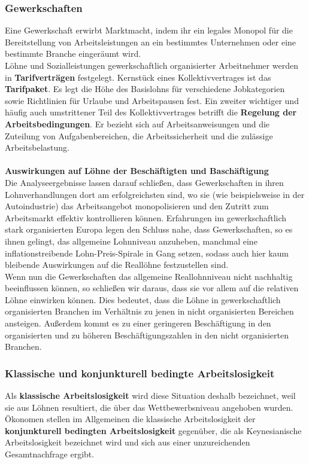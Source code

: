 \documentclass[10pt]{scrartcl}
\begin{document}
\subsubsection{Gewerkschaften}
Eine Gewerkschaft erwirbt Marktmacht, indem ihr ein legales Monopol für die Bereitstellung von Arbeitsleistungen an ein bestimmtes Unternehmen oder eine bestimmte Branche eingeräumt wird.\\
Löhne und Sozialleistungen gewerkschaftlich organisierter Arbeitnehmer werden in {\bf Tarifverträgen} festgelegt. Kernstück eines Kollektivvertrages ist das {\bf Tarifpaket}. Es legt die Höhe des Basislohns für verschiedene Jobkategorien sowie Richtlinien für Urlaube und Arbeitspausen fest. Ein zweiter wichtiger und häufig auch umstrittener Teil des Kollektivvertrages betrifft die {\bf Regelung der Arbeitsbedingungen}. Er bezieht sich auf Arbeitsanweisungen und die Zuteilung von Aufgabenbereichen, die Arbeitssicherheit und die zulässige Arbeitsbelastung. \\ \\
{\bf Auswirkungen auf Löhne der Beschäftigten und Baschäftigung}\\
Die Analyseergebnisse lassen darauf schließen, dass Gewerkschaften in ihren Lohnverhandlungen dort am erfolgreichsten sind, wo sie (wie beispielsweise in der Autoindustrie) das Arbeitsangebot monopolisieren und den Zutritt zum Arbeitsmarkt effektiv kontrollieren können. Erfahrungen im gewerkschaftlich stark organisierten Europa legen den Schluss nahe, dass Gewerkschaften, so es ihnen gelingt, das allgemeine Lohnniveau anzuheben, manchmal eine inflationstreibende Lohn-Preis-Spirale in Gang setzen, sodass auch hier kaum bleibende Auswirkungen auf die Reallöhne festzustellen sind.\\ Wenn nun die Gewerkschaften das allgemeine Reallohnniveau nicht nachhaltig beeinflussen können, so schließen wir daraus, dass sie vor allem auf die relativen Löhne einwirken können. Dies bedeutet, dass die Löhne in gewerkschaftlich organisierten Branchen im Verhältnis zu jenen in nicht organisierten Bereichen ansteigen. Außerdem kommt es zu einer geringeren Beschäftigung in den organisierten und zu höheren Beschäftigungszahlen in den nicht organisierten Branchen.

\subsubsection{Klassische und konjunkturell bedingte Arbeitslosigkeit}
Als {\bf klassische Arbeitslosigkeit } wird diese Situation deshalb bezeichnet, weil sie aus Löhnen resultiert, die über das Wettbewerbsniveau angehoben wurden. Ökonomen stellen im Allgemeinen die klassische Arbeitslosigkeit der {\bf konjunkturell bedingten Arbeitslosigkeit} gegenüber, die als Keynesianische Arbeitslosigkeit bezeichnet wird und sich aus einer unzureichenden Gesamtnachfrage ergibt. 
\end{document}
